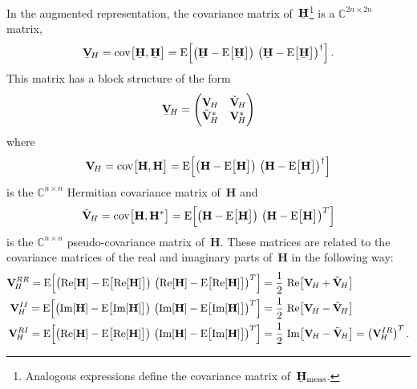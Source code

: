 In the augmented representation, the covariance matrix
of~$\underaccent{\bar}{\mathbf{H}}$\footnote{Analogous expressions
define the covariance matrix
of~$\underaccent{\bar}{\mathbf{H}}_\text{meas}$.} is a $\mathbb{C}^{2n
\times 2n}$ matrix, \ie
\begin{equation}
  \underaccent{\bar}{\covMatSym}_{\!H}
  = \cov[1]{\underaccent{\bar}{\mathbf{H}}, \underaccent{\bar}{\mathbf{H}}}
  = \exptVal[2]{\rBrk[1]{\underaccent{\bar}{\mathbf{H}} - \exptVal[1]{\underaccent{\bar}{\mathbf{H}}}}\,
  \rBrk[1]{\underaccent{\bar}{\mathbf{H}} - \exptVal[1]{\underaccent{\bar}{\mathbf{H}}}}^\dagger}.
\end{equation}
This matrix has a block structure of the form
\begin{equation}
  \label{eq:cov_augmented}
  \underaccent{\bar}{\covMatSym}_{\!H}
  = \begin{pmatrix*}[l]
    \covMatSym_{\!H} & \tilde{\covMatSym}_{\!H} \\
    \tilde{\covMatSym}_{\!H}^* & \covMatSym_{\!H}^*
  \end{pmatrix*}
\end{equation}
where
\begin{equation}
  \covMatSym_{\!H}
  = \cov[1]{\mathbf{H}, \mathbf{H}}
  = \exptVal[2]{\rBrk[1]{\mathbf{H} - \exptVal[1]{\mathbf{H}}}\, \rBrk[1]{\mathbf{H} - \exptVal[1]{\mathbf{H}}}^\dagger}
\end{equation}
is the $\mathbb{C}^{n \times n}$ Hermitian covariance matrix
of~$\mathbf{H}$ and
\begin{equation}
  \tilde{\covMatSym}_{\!H}
  = \cov[1]{\mathbf{H}, \mathbf{H}^*}
  = \exptVal[2]{\rBrk[1]{\mathbf{H} - \exptVal[1]{\mathbf{H}}}\, \rBrk[1]{\mathbf{H} - \exptVal[1]{\mathbf{H}}}^T}
\end{equation}
is the $\mathbb{C}^{n \times n}$ pseudo-covariance matrix
of~$\mathbf{H}$.  These matrices are related to the covariance
matrices of the real and imaginary parts of~$\mathbf{H}$ in the
following way:
\begin{align}
  \label{eq:cov_ReRe}
  \covMatSym_{\!H}^{RR}
  = \exptVal[2]{\rBrk[1]{\Re\!\sBrk{\mathbf{H}} - \exptVal[1]{\Re\!\sBrk{\mathbf{H}}}}\, \rBrk[1]{\Re\!\sBrk{\mathbf{H}} - \exptVal[1]{\Re\!\sBrk{\mathbf{H}}}}^T}
  ={}& \frac{1}{2}\, \Re\!\sBrk[1]{\covMatSym_{\!H} + \tilde{\covMatSym}_{\!H}}
  \\
  \label{eq:cov_ImIm}
  \covMatSym_{\!H}^{II}
  = \exptVal[2]{\rBrk[1]{\Im\!\sBrk{\mathbf{H}} - \exptVal[1]{\Im\!\sBrk{\mathbf{H}}}}\, \rBrk[1]{\Im\!\sBrk{\mathbf{H}} - \exptVal[1]{\Im\!\sBrk{\mathbf{H}}}}^T}
  ={}& \frac{1}{2}\, \Re\!\sBrk[1]{\covMatSym_{\!H} - \tilde{\covMatSym}_{\!H}}
  \\
  \label{eq:cov_ReIm}
  \covMatSym_{\!H}^{RI}
  = \exptVal[2]{\rBrk[1]{\Re\!\sBrk{\mathbf{H}} - \exptVal[1]{\Re\!\sBrk{\mathbf{H}}}}\, \rBrk[1]{\Im\!\sBrk{\mathbf{H}} - \exptVal[1]{\Im\!\sBrk{\mathbf{H}}}}^T}
  ={}& \frac{1}{2}\, \Im\!\sBrk[1]{\covMatSym_{\!H} - \tilde{\covMatSym}_{\!H}}
  = \rBrk[1]{\covMatSym_{\!H}^{IR}}^T.
\end{align}
